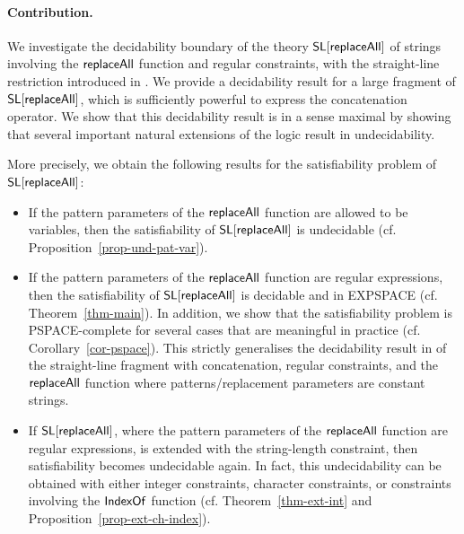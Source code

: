 \paragraph{Contribution.} We investigate the decidability boundary of the theory
$\mathsf{SL}[\mathsf{replaceAll}]$ of strings involving %
the $\mathsf{replaceAll}$ function and regular constraints, with the straight-line
restriction introduced in \cite{LB16}. We provide a decidability result for a 
large fragment of $\mathsf{SL}[\mathsf{replaceAll}]$, which is sufficiently powerful to
express the concatenation operator. We show that this decidability result is in a sense maximal
by showing that several important natural extensions of the logic result in undecidability.


More precisely,
we obtain the following results for the satisfiability problem of
$\mathsf{SL}[\mathsf{replaceAll}]$:
\begin{itemize}
\item If the pattern parameters of the $\mathsf{replaceAll}$ function are allowed to be variables, then the satisfiability of $\mathsf{SL}[\mathsf{replaceAll}]$ is undecidable (cf. Proposition~\ref{prop-und-pat-var}).
%
\item If the pattern parameters of the $\mathsf{replaceAll}$ function are regular
    expressions, then the satisfiability of $\mathsf{SL}[\mathsf{replaceAll}]$ is decidable
        and in EXPSPACE (cf. Theorem~\ref{thm-main}). In addition, we show that
        the satisfiability problem is PSPACE-complete for several cases that are
        meaningful in practice (cf. Corollary~\ref{cor-pspace}). This strictly
        generalises the decidability result in \cite{LB16} of the straight-line 
        fragment with concatenation, regular constraints, and the $\mathsf{replaceAll}$ 
        function where
        patterns/replacement parameters are constant strings.
%
\item If $\mathsf{SL}[\mathsf{replaceAll}]$, where the pattern parameters of the
    $\mathsf{replaceAll}$ function are regular expressions, is extended with the 
        string-length constraint, then satisfiability becomes undecidable
        again. In fact, this undecidability can be obtained with
        either integer constraints, character constraints, or constraints 
        involving the $\mathsf{IndexOf}$ function
        (cf. Theorem~\ref{thm-ext-int} and 
        Proposition~\ref{prop-ext-ch-index}).
\end{itemize}

